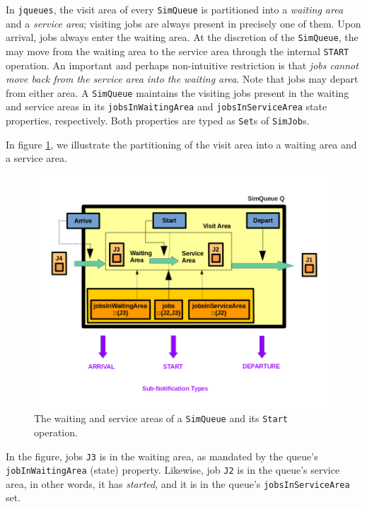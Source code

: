 In \lstinline|jqueues|,
  the visit area of every \lstinline|SimQueue|
  is partitioned into
  a {\em waiting area\/} and a {\em service area};
  visiting jobs are always present in precisely
  one of them.
Upon arrival, jobs always enter the waiting area.
At the discretion of the \lstinline|SimQueue|,
  the may move from the waiting area to
  the service area through the internal
  \lstinline|START| operation.
An important and perhaps non-intuitive restriction
  is that {\em jobs cannot move back from the service area
  into the waiting area}.
Note that jobs may depart from either area.
A \lstinline|SimQueue| maintains the
  visiting jobs present in the waiting and service areas
  in its \lstinline|jobsInWaitingArea|
  and \lstinline|jobsInServiceArea| state properties,
  respectively.
Both properties are typed as
  \lstinline|Set|s of \lstinline|SimJob|s.
  
In figure \ref{fig:ArriveDepartStart},
  we illustrate the partitioning of the
  visit area into a waiting area and
  a service area.
  
\begin{figure}[!htbp]
\label{fig:ArriveDepartStart}
\caption{The waiting and service areas of
         a \texttt{SimQueue} and its \texttt{Start} operation.}
\includegraphics[width=\textwidth]{fig/ArriveDepartStart}
\end{figure}

In the figure,
  jobs \lstinline|J3| is in the waiting area,
  as mandated by the queue's
  \lstinline|jobInWaitingArea|
  (state) property.
Likewise,
  job \lstinline|J2| is in the queue's service area,
  in other words,
  it has {\em started},
  and it is in the queue's
  \lstinline|jobsInServiceArea|
  set.
  
